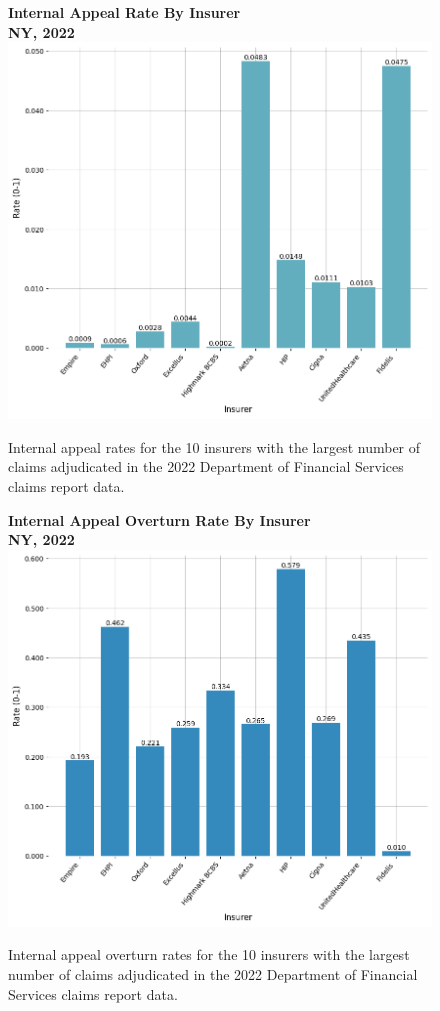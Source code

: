 \documentclass[12pt, a4paper,twoside,parskip=full]{report}
\theoremstyle{plain} %
\theoremstyle{definition} %
\theoremstyle{remark} %
\numberwithin{equation}{chapter}
\begin{document}
		\begin{figure}[h!]
			\centering
			\textbf{Internal Appeal Rate By Insurer}\\ 
			\textbf{NY, 2022}\\
			\includegraphics[width=.8\columnwidth]{images/ny_claim_reports/appeal_rate_by_insurer.png}
			\caption{ Internal appeal rates for the 10 insurers with the largest number of claims adjudicated in the 2022 Department of Financial Services claims report data.}
			\label{nyinternalappealratebyinsurer}
		\end{figure}
		
		
		\begin{figure}[h!]
			\centering
			\textbf{Internal Appeal Overturn Rate By Insurer}\\
			\textbf{NY, 2022}\\
			\includegraphics[width=.8\columnwidth]{images/ny_claim_reports/internal_appeal_overturn_rate_by_insurer.png}
			\caption{Internal appeal overturn rates for the 10 insurers with the largest number of claims adjudicated in the 2022 Department of Financial Services claims report data.}
			\label{nyinternalappealoverturnratebyinsurer}
		\end{figure}
		
\end{document}
